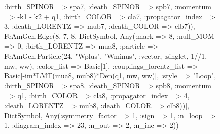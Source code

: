 \documentclass{revtex4}
\begin{document}
\begin{figure}[!htb]
\begin{center}
{:birth_SPINOR => spa7, :death_SPINOR => spb7, :momentum => -k1 - k2 + q1, :birth_COLOR => cla7, :propagator_index => 3, :death_LORENTZ => mub7, :death_COLOR => clb7)), FeAmGen.Edge(8, 7, 8, Dict{Symbol, Any}(:mark => 8, :null_MOM => 0, :birth_LORENTZ => mua8, :particle => FeAmGen.Particle(24, "Wplus", "Wminus", :vector, :singlet, 1//1, mw, ww), :color_list => Basic[1], :couplings_lorentz_list => Basic[-im*LMT(mua8, mub8)*Den(q1, mw, ww)], :style => "Loop", :birth_SPINOR => spa8, :death_SPINOR => spb8, :momentum => q1, :birth_COLOR => cla8, :propagator_index => 4, :death_LORENTZ => mub8, :death_COLOR => clb8))], Dict{Symbol, Any}(:symmetry_factor => 1, :sign => 1, :n_loop => 1, :diagram_index => 23, :n_out => 2, :n_inc => 2)) 
}
\end{center}
\end{figure}
\end{document}
